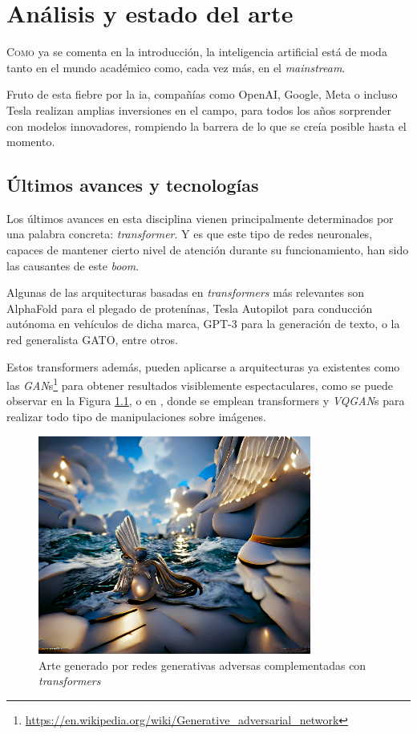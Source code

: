 \chapter{Análisis y estado del arte}
\label{chap:analisis_estado_arte}

\lettrine{C}{omo} ya se comenta en la introducción, la inteligencia artificial está de moda tanto en el mundo académico como, cada vez más, en el \textit{mainstream}.

Fruto de esta fiebre por la \acrshort{ia}, compañías como OpenAI, Google, Meta o incluso Tesla realizan amplias inversiones en el campo, para todos los años sorprender con modelos innovadores, rompiendo la barrera de lo que se creía posible hasta el momento.

\section{Últimos avances y tecnologías}
\label{sec:ultimos_avances_tecnologias}
Los últimos avances en esta disciplina vienen principalmente determinados por una palabra concreta: \textit{transformer}. Y es que este tipo de redes neuronales, capaces de mantener cierto nivel de atención \cite{vaswani2017attention_all_you_need} durante su funcionamiento, han sido las causantes de este \textit{boom}.

Algunas de las arquitecturas basadas en \textit{transformers} más relevantes son AlphaFold para el plegado de protenínas, Tesla Autopilot para conducción autónoma en vehículos de dicha marca, GPT-3 para la generación de texto, o la red generalista GATO, entre otros.

Estos transformers además, pueden aplicarse a arquitecturas ya existentes como las \textit{GAN}s\footnote{\url{https://en.wikipedia.org/wiki/Generative\_adversarial\_network}} para obtener resultados visiblemente espectaculares, como se puede observar en la Figura \ref{fig:vqgan_image}, o en \cite{chang2022maskgit}, donde se emplean transformers y \textit{VQGAN}s para realizar todo tipo de manipulaciones sobre imágenes.

\begin{figure}[h!]
    \centering
    \includegraphics[width=0.8\textwidth]{img/vqgan_image.png}
    \caption{Arte generado por redes generativas adversas complementadas con \textit{transformers}}
    \label{fig:vqgan_image}
\end{figure}

